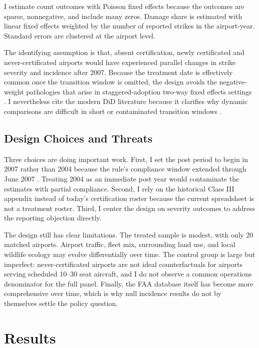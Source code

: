 \documentclass[12pt]{article}
\begin{document}
I estimate count outcomes with Poisson fixed effects because the outcomes are sparse, nonnegative, and include many zeros. Damage share is estimated with linear fixed effects weighted by the number of reported strikes in the airport-year. Standard errors are clustered at the airport level.

The identifying assumption is that, absent certification, newly certificated and never-certificated airports would have experienced parallel changes in strike severity and incidence after 2007. Because the treatment date is effectively common once the transition window is omitted, the design avoids the negative-weight pathologies that arise in staggered-adoption two-way fixed effects settings \citep{Goodman_Bacon_2021}. I nevertheless cite the modern DiD literature because it clarifies why dynamic comparisons are difficult in short or contaminated transition windows \citep{Callaway_2021,Sun_2021}.

\subsection{Design Choices and Threats}

Three choices are doing important work. First, I set the post period to begin in 2007 rather than 2004 because the rule's compliance window extended through June 2007 \citep{faa_reg_eval_2004}. Treating 2004 as an immediate post year would contaminate the estimates with partial compliance. Second, I rely on the historical Class III appendix instead of today's certification roster because the current spreadsheet is not a treatment roster. Third, I center the design on severity outcomes to address the reporting objection directly.

The design still has clear limitations. The treated sample is modest, with only 20 matched airports. Airport traffic, fleet mix, surrounding land use, and local wildlife ecology may evolve differentially over time. The control group is large but imperfect: never-certificated airports are not ideal counterfactuals for airports serving scheduled 10--30 seat aircraft, and I do not observe a common operations denominator for the full panel. Finally, the FAA database itself has become more comprehensive over time, which is why null incidence results do not by themselves settle the policy question.

\section{Results}
\end{document}
